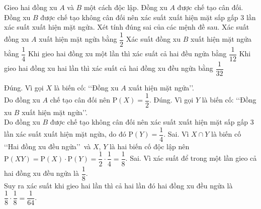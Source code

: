 \begin{ex}%
Gieo hai đồng xu $A$ và $B$ một cách độc lập. Đồng xu $A$ được chế tạo cân đối. Đồng xu $B$ được chế tạo không cân đối nên xác suất xuất hiện mặt sấp gấp $3$ lần xác suất xuất hiện mặt ngửa. Xét tính đúng sai của các mệnh đề sau.
\choiceTF
{\True Xác suất đồng xu $A$ xuất hiện mặt ngửa bằng $\dfrac{1}{2}$}
{\True Xác suất đồng xu $B$ xuất hiện mặt ngửa bằng $\dfrac{1}{4}$}
{Khi gieo hai đồng xu một lần thì xác suất cả hai đều ngửa bằng $\dfrac{1}{12}$}
{Khi gieo hai đồng xu hai lần thì xác suất cả hai đồng xu đều ngửa bằng $\dfrac{1}{32}$}
\loigiai
{
\begin{itemchoice}
\itemch Đúng. Vì gọi $X$ là biến cố: \lq\lq Đồng xu $A$ xuất hiện mặt ngửa\rq\rq.\\
Do đồng xu $A$ chế tạo cân đối nên $\mathrm{P}(X)=\dfrac{1}{2}$.
\itemch Đúng. Vì gọi $Y$ là biến cố: \lq\lq Đồng xu $B$ xuất hiện mặt ngửa\rq\rq.\\
Do đồng xu $B$ được chế tạo không cân đối nên xác suất xuất hiện mặt sấp gấp $3$ lần xác suất xuất hiện mặt ngửa, do đó $\mathrm{P}(Y)=\dfrac{1}{4}$.
\itemch Sai. Vì $X\cap Y$ là biến cố \lq\lq Hai đồng xu đều ngửa\rq\rq\ và $X$, $Y$ là hai biến cố độc lập nên $\mathrm{P}(XY)=\mathrm{P}(X)\cdot\mathrm{P}(Y)=\dfrac{1}{2}\cdot\dfrac{1}{4}=\dfrac{1}{8}$.
\itemch Sai. Vì xác suất để trong một lần gieo cả hai đồng xu đều ngửa là $\dfrac{1}{8}$.\\
Suy ra xác suất khi gieo hai lần thì cả hai lần đó hai đồng xu đều ngửa là $\dfrac{1}{8}\cdot\dfrac{1}{8}=\dfrac{1}{64}$.
\end{itemchoice}
}
\end{ex}

